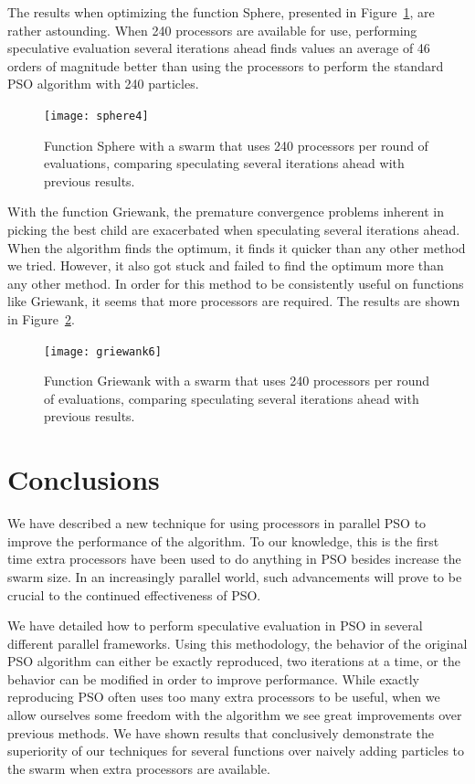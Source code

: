 \documentclass[journal,letterpaper]{IEEEtran}
\newcommand{\fig}[1]{Figure~\ref{fig:#1}}
\begin{document}
The results when optimizing the function Sphere, presented in
\fig{sphere-manyiters}, are rather astounding.  When 240 processors are
available for use, performing speculative evaluation several iterations ahead
finds values an average of 46 orders of magnitude better than using the
processors to perform the standard PSO algorithm with 240 particles.

\begin{figure}
  \centering
  \texttt{[image: sphere4]}
  \caption{Function Sphere with a swarm that uses 240 processors per round of
  evaluations, comparing speculating several iterations ahead with previous
  results.}
  \label{fig:sphere-manyiters}
\end{figure}

With the function Griewank, the premature convergence problems inherent in
picking the best child are exacerbated when speculating several iterations
ahead.  When the algorithm finds the optimum, it finds it quicker than any
other method we tried.  However, it also got stuck and failed to find the
optimum more than any other method.  In order for this method to be
consistently useful on functions like Griewank, it seems that more processors
are required.  The results are shown in \fig{griewank-manyiters}.

\begin{figure}
  \centering
  \texttt{[image: griewank6]}
  \caption{Function Griewank with a swarm that uses 240 processors per round of
  evaluations, comparing speculating several iterations ahead with previous
  results.}
  \label{fig:griewank-manyiters}
\end{figure}

\section{Conclusions}
\label{sec:conclusion}

We have described a new technique for using processors in parallel PSO to
improve the performance of the algorithm.  To our knowledge, this is the first
time extra processors have been used to do anything in PSO besides increase the
swarm size.  In an increasingly parallel world, such advancements will prove to
be crucial to the continued effectiveness of PSO.

We have detailed how to perform speculative evaluation in PSO in several
different parallel frameworks.  Using this methodology, the behavior of the
original PSO algorithm can either be exactly reproduced, two iterations at a
time, or the behavior can be modified in order to improve performance.  While
exactly reproducing PSO often uses too many extra processors to be useful, when
we allow ourselves some freedom with the algorithm we see great improvements
over previous methods.  We have shown results that conclusively demonstrate the
superiority of our techniques for several functions over naively adding
particles to the swarm when extra processors are available.
\end{document}
